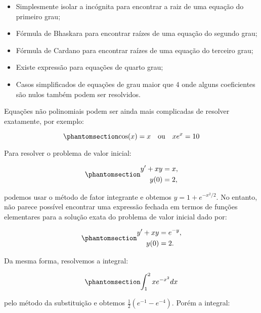 \documentclass[
  a4paper,
  DIV=11,
  numbers=noendperiod,
  oneside]{scrreprt}
\providecommand{\tightlist}{%
  \setlength{\itemsep}{0pt}\setlength{\parskip}{0pt}}\usepackage{longtable,booktabs,array}
\begin{document}
\begin{itemize}
\tightlist
\item
  Simplesmente isolar a incógnita para encontrar a raiz de uma equação
  do primeiro grau;
\item
  Fórmula de Bhaskara para encontrar raízes de uma equação do segundo
  grau;
\item
  Fórmula de Cardano para encontrar raízes de uma equação do terceiro
  grau;
\item
  Existe expressão para equações de quarto grau;
\item
  Casos simplificados de equações de grau maior que 4 onde alguns
  coeficientes são nulos também podem ser resolvidos.
\end{itemize}

Equações não polinomiais podem ser ainda mais complicadas de resolver
exatamente, por exemplo:

\begin{equation}\phantomsection\label{eq-exemplo1}{
\cos(x) = x \quad \text{ou} \quad xe^x = 10
}\end{equation}

Para resolver o problema de valor inicial:

\begin{equation}\phantomsection\label{eq-exemplo2}{
\begin{aligned}
y' + xy &= x, \\
y(0) &= 2,
\end{aligned}
}\end{equation}

podemos usar o método de fator integrante e obtemos
{\(y = 1 + e^{-x^2/2}\).} No entanto, não parece possível encontrar uma
expressão fechada em termos de funções elementares para a solução exata
do problema de valor inicial dado por:

\begin{equation}\phantomsection\label{eq-exemplo3}{
\begin{aligned}
y' + xy &= e^{-y}, \\
y(0) &= 2.
\end{aligned}
}\end{equation}

Da mesma forma, resolvemos a integral:

\begin{equation}\phantomsection\label{eq-exemplo4}{
\int_1^2 x e^{-x^2} dx
}\end{equation}

pelo método da substituição e obtemos
{\(\frac{1}{2}(e^{-1} - e^{-4})\).} Porém a integral:
\end{document}
